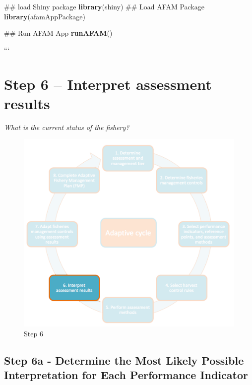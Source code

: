 \documentclass[]{book}
\newenvironment{Shaded}{\begin{snugshade}}{\end{snugshade}}
\newcommand{\KeywordTok}[1]{\textcolor[rgb]{0.13,0.29,0.53}{\textbf{#1}}}
\newcommand{\NormalTok}[1]{#1}
\begin{document}
\begin{Shaded}
\begin{Highlighting}[]
\NormalTok{## load Shiny package}
\KeywordTok{library}\NormalTok{(shiny)}
\NormalTok{## Load AFAM Package}
\KeywordTok{library}\NormalTok{(afamAppPackage)}

\NormalTok{## Run AFAM App}
\KeywordTok{runAFAM}\NormalTok{()}
\end{Highlighting}
\end{Shaded}

```

\hypertarget{Step6}{\chapter{Step 6 -- Interpret assessment
results}\label{Step6}}

\emph{What is the current status of the fishery?}

\begin{figure}
\centering
\includegraphics{myMediaFolder/media/Step6.png}
\caption{\label{fig:Step6}Step 6}
\end{figure}

\section{Step 6a - Determine the Most Likely Possible Interpretation for
Each Performance
Indicator}\label{step-6a---determine-the-most-likely-possible-interpretation-for-each-performance-indicator}
\end{document}
